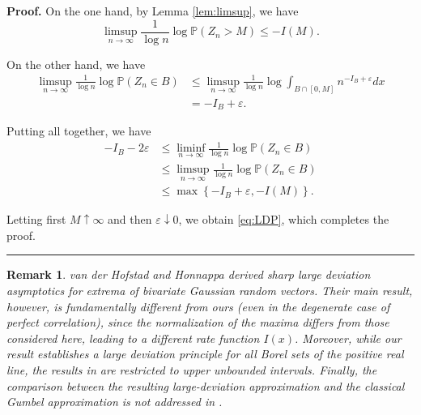 \documentclass[12pt]{article}%
\newtheorem{remark}[theorem]{Remark}
\newenvironment{proof}[1][Proof]{\textbf{#1.} }{\ \rule{0.5em}{0.5em}}
\newcommand{\PP}{\mathbb{P}}
\begin{document}
\begin{proof}
On the one hand, by Lemma \ref{lem:limsup}, we have
$$
\limsup_{n\to\infty}\frac{1}{\log n}\log \PP(Z_n>M)\le -I(M).
$$

On the other hand, we have
\begin{align*}
\limsup_{n\to\infty}\frac{1}{\log n}\log\PP(Z_n\in B)&
\le \limsup_{n\to\infty}\frac{1}{\log n}\log \int_{B\cap[0,M]} n^{-I_B+\varepsilon} dx\\
&=-I_B+\varepsilon.
\end{align*}

Putting all together, we have
\begin{align*}
-I_B-2\varepsilon&\le \liminf_{n\to\infty}\frac{1}{\log n}\log\PP(Z_n\in B)\\
 &\le \limsup_{n\to\infty}\frac{1}{\log n}\log\PP(Z_n\in B)\\
&\le \max\left\{-I_B+\varepsilon,-I(M)\right\}.
\end{align*}

Letting first $M\uparrow\infty$ and then $\varepsilon\downarrow0$, we obtain \eqref{eq:LDP}, 
which completes the proof.
\end{proof}


\begin{remark}
van der Hofstad and Honnappa \cite{van} derived sharp large deviation asymptotics for extrema of bivariate Gaussian random vectors. Their main result, however, is fundamentally different from ours (even in the degenerate case of perfect correlation), since  the normalization of the maxima differs from those considered here, leading to a different rate function $I(x)$. Moreover, while our result establishes a large deviation principle for all Borel sets of the positive real line, the results in \cite{van} are restricted to upper unbounded intervals. Finally, the comparison between the resulting large-deviation approximation and the classical Gumbel approximation is not addressed in \cite{van}.
\end{remark}
\end{document}
